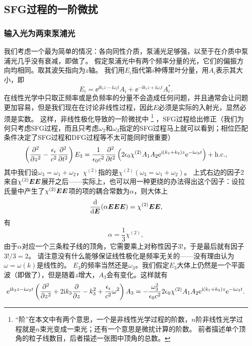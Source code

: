 \subsection{SFG过程的一阶微扰}

\subsubsection{输入光为两束泵浦光}

我们考虑一个最为简单的情况：各向同性介质，泵浦光足够强，以至于在介质中泵浦光几乎没有衰减，即做了。
假定泵浦光中有两个频率分量的光，它们的偏振方向均相同。取其波矢指向为$z$轴。
我们用$E_i$指代第$i$种傅里叶分量，用$A_i$表示其大小，即
\[
    E_i = \ee^{\ii k_i z - \ii \omega_i t} A_i + \ee^{- \ii k_i z + \ii \omega_i t} A_i^*.
\]
在线性光学中只取正频率或是负频率的分量不会造成任何问题，并且通常会让问题更加容易，但是我们现在在讨论非线性过程，因此$E$必须是实际的入射光，显然必须是实数。
这样，非线性极化导致的一阶微扰中%
\footnote{
    “阶”在本文中有两个意思，一个是非线性光学过程的阶数，$n$阶非线性光学过程就是$n$束光变成一束光；还有一个意思是微扰计算的阶数。
    前者描述单个顶角的粒子线数目，后者描述一张图中顶角的总数。
}%
，SFG过程给出修正（我们为何只考虑SFG过程，而且只考虑$\omega_2$和$\omega_3$指定的SFG过程马上就可以看到；相位匹配条件决定了SFG过程和DFG过程等不太可能同时很重要）
\[
    \left( \pdv[2]{z} - \frac{\epsilon_\text{r}}{c^2} \pdv[2]{t} \right) E_3 = \frac{1}{\epsilon_0 c^2} \pdv[2]{t} \left( 2 \epsilon_0  \chi^{(2)} A_1 A_2 \mathrm{e}^{\mathrm{i} (k_1 + k_2) z} \mathrm{e}^{-\mathrm{i} \omega_3 t} \right) + \text{h.c.},
\]
其中我们设$\omega_3 = \omega_1 + \omega_2$，$\chi^{(2)}$指的是$\chi^{(2)}(\omega_3=\omega_1+\omega_2)$。
上式右边的因子$2$来自$\chi^{(2)} \vb*{E} \vb*{E}$展开之后——实际上，也可以用一种更绕的办法得出这个因子：设拉氏量中产生了$\chi^{(2)} \vb*{E} \vb*{E}$项的项的耦合常数为$\alpha$，则大体上
\[
    \dv{\vb*{E}} (\alpha \vb*{E} \vb*{E} \vb*{E}) = \chi^{(2)} \vb*{E} \vb*{E},
\]
有
\[
    \alpha = \frac{1}{3} \chi^{(2)},
\]
由于$\alpha$对应一个三条粒子线的顶角，它需要乘上对称性因子$3!$，于是最后就有因子$3! / 3 = 2$。
请注意没有什么能够保证线性极化是频率无关的——没有理由认为$\omega=\omega(k)$是线性的。
$E_3$的频率当然还是$\omega_3$。我们假定$E_3$大体上仍然是一个平面波（即做了），但是随着$z$增大，$A_3$会有变化。这样就有
\[
    \mathrm{e}^{\mathrm{i} k_3 z - \mathrm{i} \omega_3 t} \left( \pdv[2]{z} + 2 \mathrm{i} k_3 \pdv{z} - k_3^2 + \frac{\epsilon_\text{r}}{c^2} \omega^2 \right) A_3 = - \frac{\omega_3^2}{\epsilon_0 c^2} 2 \epsilon_0  \chi^{(2)} A_1 A_2 \mathrm{e}^{\mathrm{i} (k_1 + k_2) z} \mathrm{e}^{-\mathrm{i} \omega_3 t} .
\]

